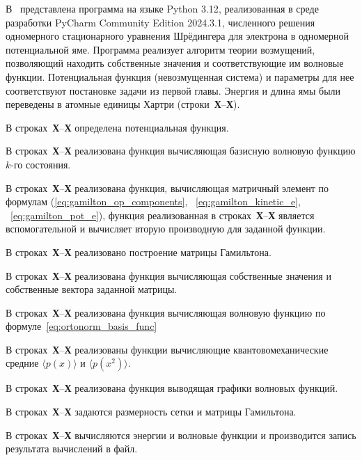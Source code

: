 В~ представлена программа на языке Python 3.12\cite{python},
реализованная в среде разработки PyCharm Community Edition 2024.3.1,
численного решения одномерного стационарного уравнения Шрёдингера для электрона в одномерной потенциальной яме.
Программа реализует алгоритм теории возмущений,
позволяющий находить собственные значения и соответствующие им волновые функции.
Потенциальная функция (невозмущенная система) и параметры для нее соответствуют постановке задачи из первой главы.
Энергия и длина ямы были переведены в атомные единицы Хартри (строки~\textbf{Х}--\textbf{Х}).


В строках~\textbf{Х}--\textbf{Х} определена потенциальная функция.


В строках~\textbf{Х}--\textbf{Х} реализована функция вычисляющая базисную волновую функцию $k$-го состояния.


В строках~\textbf{Х}--\textbf{Х} реализована функция, вычисляющая матричный элемент по формулам (\ref{eq:gamilton_op_components}, ~\ref{eq:gamilton_kinetic_e}, ~\ref{eq:gamilton_pot_e}), функция реализованная в строках~\textbf{Х}--\textbf{Х} является вспомогательной и вычисляет вторую производную для заданной функции.


В строках~\textbf{Х}--\textbf{Х} реализовано построение матрицы Гамильтона.


В строках~\textbf{Х}--\textbf{Х} реализована функция вычисляющая собственные значения и собственные вектора заданной матрицы.


В строках~\textbf{Х}--\textbf{Х} реализована функция вычисляющая волновую функцию по формуле~\eqref{eq:ortonorm_basis_func}


В строках~\textbf{Х}--\textbf{Х} реализованы функции вычисляющие квантовомеханические средние $\langle p(x) \rangle$ и $\langle p(x^2) \rangle$.


В строках~\textbf{Х}--\textbf{Х} реализована функция выводящая графики волновых функций.


В строках~\textbf{Х}--\textbf{Х} задаются размерность сетки и матрицы Гамильтона.


В строках~\textbf{Х}--\textbf{Х} вычисляются энергии и волновые функции и производится запись результата вычислений в файл.